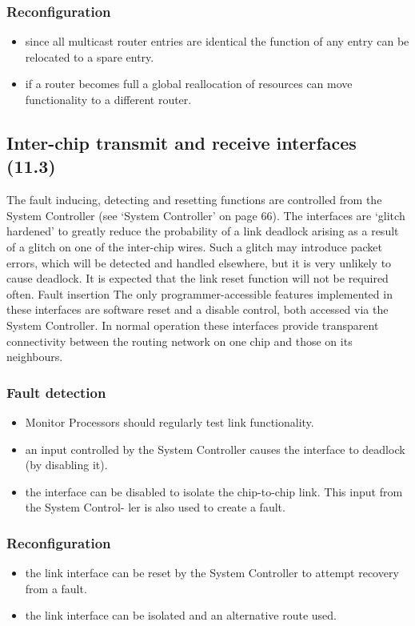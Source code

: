 \documentclass[12pt]{article}
\newenvironment{itmz}{
	\begin{itemize}
		\setlength{\itemsep}{0pt}
		\setlength{\parskip}{0pt}
	}{\end{itemize}}
\begin{document}
\subsubsection*{Reconfiguration}
\begin{itmz}
\item since all multicast router entries are identical the function of any entry can be relocated to a spare
entry.
\item if a router becomes full a global reallocation of resources can move functionality to a different
router.
\end{itmz}

\subsection{Inter-chip transmit and receive interfaces (11.3)}
The fault inducing, detecting and resetting functions are controlled from the System Controller (see
`System Controller' on page 66). The interfaces are `glitch hardened' to greatly reduce the
probability of a link deadlock arising as a result of a glitch on one of the inter-chip wires. Such a
glitch may introduce packet errors, which will be detected and handled elsewhere, but it is very
unlikely to cause deadlock. It is expected that the link reset function will not be required often.
Fault insertion
The only programmer-accessible features implemented in these interfaces are software reset and a
disable control, both accessed via the System Controller. In normal operation these interfaces
provide transparent connectivity between the routing network on one chip and those on its
neighbours.
\subsubsection*{Fault detection}
\begin{itmz}
\item Monitor Processors should regularly test link functionality.
\item an input controlled by the System Controller causes the interface to deadlock (by disabling it).
\item the interface can be disabled to isolate the chip-to-chip link. This input from the System Control-
ler is also used to create a fault.
\end{itmz}
\subsubsection*{Reconfiguration}
\begin{itmz}
\item the link interface can be reset by the System Controller to attempt recovery from a fault.
\item the link interface can be isolated and an alternative route used.
\end{itmz}
\end{document}

